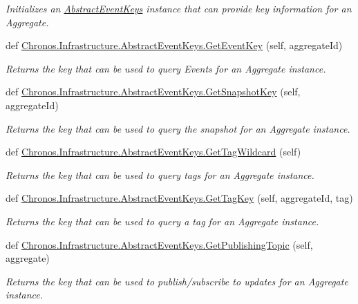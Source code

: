 \begin{DoxyCompactItemize}
\begin{DoxyCompactList}\small\item\em Initializes an \hyperlink{classChronos_1_1Infrastructure_1_1AbstractEventKeys}{Abstract\+Event\+Keys} instance that can provide key information for an Aggregate. \end{DoxyCompactList}\item 
def \hyperlink{group__Chronos_gae344da5f301d8e117652a50fdbf880b3}{Chronos.\+Infrastructure.\+Abstract\+Event\+Keys.\+Get\+Event\+Key} (self, aggregate\+Id)
\begin{DoxyCompactList}\small\item\em Returns the key that can be used to query Events for an Aggregate instance. \end{DoxyCompactList}\item 
def \hyperlink{group__Chronos_gaea065e98844ec3d197f7073282e77904}{Chronos.\+Infrastructure.\+Abstract\+Event\+Keys.\+Get\+Snapshot\+Key} (self, aggregate\+Id)
\begin{DoxyCompactList}\small\item\em Returns the key that can be used to query the snapshot for an Aggregate instance. \end{DoxyCompactList}\item 
def \hyperlink{group__Chronos_ga8c42a79952d93373b91ac1af682beb6d}{Chronos.\+Infrastructure.\+Abstract\+Event\+Keys.\+Get\+Tag\+Wildcard} (self)
\begin{DoxyCompactList}\small\item\em Returns the key that can be used to query tags for an Aggregate instance. \end{DoxyCompactList}\item 
def \hyperlink{group__Chronos_ga60f250ee6e509e9bcc5626e154a40b8f}{Chronos.\+Infrastructure.\+Abstract\+Event\+Keys.\+Get\+Tag\+Key} (self, aggregate\+Id, tag)
\begin{DoxyCompactList}\small\item\em Returns the key that can be used to query a tag for an Aggregate instance. \end{DoxyCompactList}\item 
def \hyperlink{group__Chronos_ga09c352e9895b9ef04abfa95785a9c183}{Chronos.\+Infrastructure.\+Abstract\+Event\+Keys.\+Get\+Publishing\+Topic} (self, aggregate)
\begin{DoxyCompactList}\small\item\em Returns the key that can be used to publish/subscribe to updates for an Aggregate instance. \end{DoxyCompactList}\item 

\end{DoxyCompactItemize}
